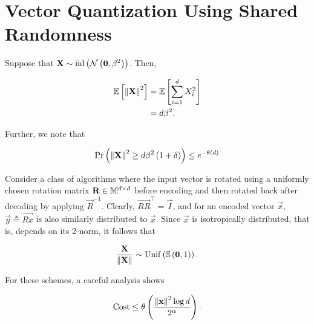 \documentclass[twoside]{article}
\begin{document}



\section{Vector Quantization Using Shared Randomness}

Suppose that \(\boldsymbol{\mathbf{X}} \sim \mathrm{iid}\left(\mathcal N\left(\boldsymbol{\mathbf{0}},\beta^2\right)\right)\). Then,

\begin{align}
    \mathbb{E}\left[ \left\lVert\boldsymbol{\mathbf{X}}\right\rVert^2 \right] &= \mathbb{E}\left[ \sum_{i=1}^dX_i^2 \right] \\
                            &= d\beta^2.
                            \label{eq:exp2-norm}
\end{align}

Further, we note that

\begin{equation}
    \Pr\left(\left\lVert\boldsymbol{\mathbf{X}}\right\rVert^2 \ge d\beta^2\left(1+\delta\right)\right) \le e^{-\theta\left(d\right)}
    \label{eq:exp-conc-ineq}
\end{equation}

Consider a class of algorithms where the input vector is rotated using a 
uniformly chosen rotation matrix \(\boldsymbol{\mathbf{R}}\in\mathbb M^{d\times d}\) before encoding 
and then rotated back after decoding by applying \(\vec{R}^{-1}\). Clearly, 
\(\vec{RR}^\top = \vec{I}\), and for an encoded vector \(\vec{x}\), \(\vec{y} 
\triangleq \vec{Rx}\) is also similarly distributed to \(\vec{x}\). Since 
\(\vec{x}\) is isotropically distributed, that is, depends on its 2-norm, it 
follows that

\begin{equation}
    \frac{\boldsymbol{\mathbf{X}}}{\left\lVert\boldsymbol{\mathbf{X}}\right\rVert} \sim \mathrm{Unif}\left(\mathbb S\left(\boldsymbol{\mathbf{0}},1\right)\right).
    \label{eq:unif-x-by-norm}
\end{equation}

For these schemes, a careful analysis shows

\begin{equation}
    \mathrm{Cost} \le \theta\left(\frac{\left\lVert\boldsymbol{\mathbf{x}}\right\rVert^2\log{d}}{2^\alpha}\right).
    \label{eq:cost-rot}
\end{equation}
\end{document}
